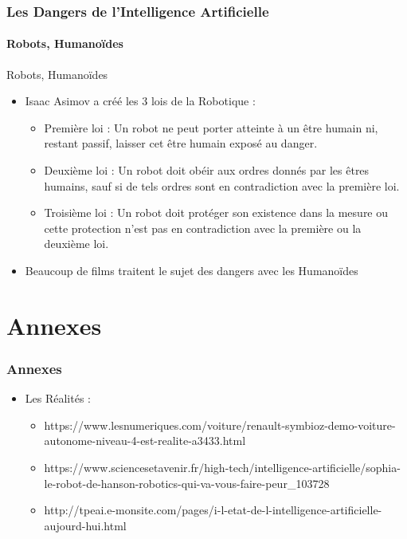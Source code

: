 \documentclass{beamer}
\begin{document}
	\begin{frame}
	\frametitle{Les Dangers de l'Intelligence Artificielle}
	\framesubtitle{Robots, Humanoïdes}
	\begin{block}{Robots, Humanoïdes}
	\begin{itemize}
	\itemsep1em
		\item Isaac Asimov a créé les 3 lois de la Robotique :
		\begin{itemize}
		\itemsep1em
			\item Première loi : Un robot ne peut porter atteinte à un être humain ni, restant passif, laisser cet être humain exposé au danger.
			\item Deuxième loi : Un robot doit obéir aux ordres donnés par les êtres humains, sauf si de tels ordres sont en contradiction avec la première loi.
			\item Troisième loi : Un robot doit protéger son existence dans la mesure ou cette protection n'est pas en contradiction avec la première ou la deuxième loi.
		\end{itemize}
		\item Beaucoup de films traitent le sujet des dangers avec les Humanoïdes
	\end{itemize}
	\end{block}
	\end{frame}
	
	
	\section{Annexes}
	\begin{frame}
	\frametitle{Annexes}
	\begin{itemize}
	\itemsep1em
		\item Les Réalités :
		\begin{itemize}
		\itemsep1em
			\item https://www.lesnumeriques.com/voiture/renault-symbioz-demo-voiture-autonome-niveau-4-est-realite-a3433.html
			\item https://www.sciencesetavenir.fr/high-tech/intelligence-artificielle/sophia-le-robot-de-hanson-robotics-qui-va-vous-faire-peur\_103728
			\item http://tpeai.e-monsite.com/pages/i-l-etat-de-l-intelligence-artificielle-aujourd-hui.html
		\end{itemize}
		\end{itemize}
	\end{frame}	
		
\end{document}
